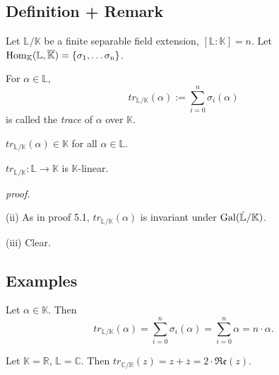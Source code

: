 \documentclass[12pt]{book}
\begin{document}
\begin{spacing}{1.3}
\subsection{Definition + Remark}%
Let $\mathbb{L}/\mathbb{K}$ be a finite separable field extension, $[\mathbb{L}:\mathbb{K}]=n$. Let $\rm{Hom}_{\mathbb{K}}(\mathbb{L},\overline{\mathbb{K}})=\{\sigma_1, \dots \sigma_n\}$.
\begin{compactenum}
\item For $\alpha \in \mathbb{L}$, 
$$tr_{\mathbb{L}/\mathbb{K}}(\alpha):=\sum_{i=0}^n \sigma_i(\alpha)$$
is called the \textit{trace} of $\alpha$ over $\mathbb{K}$.
\item $tr_{\mathbb{L}/\mathbb{K}}(\alpha) \in \mathbb{K}$ for all $\alpha \in \mathbb{L}$.
\item $tr_{\mathbb{L}/\mathbb{K}}: \mathbb{L} \longrightarrow \mathbb{K}$ is $\mathbb{K}$-linear.
\end{compactenum}
\textit{proof.}
\begin{compactenum}
\item[(ii)] As in proof 5.1, $tr_{\mathbb{L}/\mathbb{K}}(\alpha)$ is invariant under $\rm{Gal}(\tilde{\mathbb{L}}/\mathbb{K})$.
\item[(iii)] Clear.
\end{compactenum}

\subsection*{Examples} %
\titleformat{\subsection}{\normalfont\normalsize\bfseries}{}{0em}{#1 \thesubsection}
\begin{compactenum}
\item Let $\alpha \in \mathbb{K}$. Then
$$tr_{\mathbb{L}/\mathbb{K}}(\alpha)=\sum_{i=0}^n \sigma_i(\alpha)=\sum_{i=0}^n \alpha = n \cdot \alpha.$$
\item Let $\mathbb{K}=\mathbb{R}$, $\mathbb{L}=\mathbb{C}$. Then $tr_{\mathbb{C}/\mathbb{R}}(z)=z+\overline{z}= 2 \cdot \mathfrak{Re}(z)$.
\end{compactenum}


\end{spacing}
\end{document}
